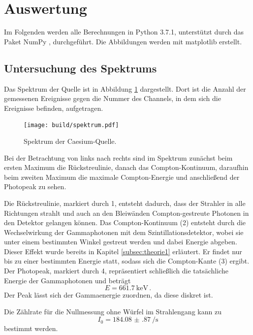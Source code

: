 \section{Auswertung}
\label{sec:Auswertung}

Im Folgenden werden alle Berechnungen in Python 3.7.1, unterstützt durch das
Paket NumPy \cite{numpy}, durchgeführt. Die Abbildungen werden mit matplotlib \cite{matplotlib} erstellt.

\subsection{Untersuchung des Spektrums}

Das Spektrum der Quelle ist in Abbildung \ref{fig:spektrum} dargestellt. Dort ist die Anzahl der gemessenen Ereignisse gegen die Nummer des Channels, in dem sich die Ereignisse befinden, aufgetragen.

\begin{figure}
  \centering
  \texttt{[image: build/spektrum.pdf]}
  \caption{Spektrum der Caesium-Quelle.}
  \label{fig:spektrum}
\end{figure}

Bei der Betrachtung von links nach rechts sind im Spektrum zunächst beim ersten
Maximum die Rückstreulinie, danach das Compton-Kontinuum, daraufhin beim zweiten
Maximum die maximale Compton-Energie und anschließend der Photopeak zu sehen.

Die Rückstreulinie, markiert durch 1, entsteht dadurch, dass der Strahler in alle Richtungen strahlt und auch an den Bleiwänden Compton-gestreute Photonen in den Detektor gelangen können. Das Compton-Kontinuum (2) entsteht durch die Wechselwirkung der Gammaphotonen mit dem Szintillationsdetektor, wobei sie unter einem bestimmten Winkel gestreut werden und dabei Energie abgeben. Dieser Effekt wurde bereits in Kapitel \ref{subsec:theorie1} erläutert. Er findet nur bis zu einer bestimmten Energie statt, sodass sich die Compton-Kante (3) ergibt.
Der Photopeak, markiert durch 4, repräsentiert schließlich die tatsächliche Energie der Gammaphotonen
und beträgt \cite{energie}
\begin{equation*}
  E=\SI{661.7}{\kilo\eV} \,.
\end{equation*}
Der Peak lässt sich der Gammaenergie zuordnen, da diese diskret ist.

Die Zählrate für die Nullmessung ohne Würfel im Strahlengang kann zu
\begin{equation*}
  I_0=\SI{184.08(87)}{\per \second}
\end{equation*}
bestimmt werden.

